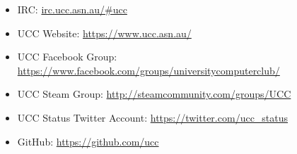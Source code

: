 
\begin{itemize}
\item IRC:  \url{irc.ucc.asn.au/\#ucc}
\item UCC Website:  \url{https://www.ucc.asn.au/}
\item UCC Facebook Group:  \\ \noindent \url{https://www.facebook.com/groups/universitycomputerclub/}
\item UCC Steam Group: \url{http://steamcommunity.com/groups/UCC}
\item UCC Status Twitter Account: \url{https://twitter.com/ucc_status}
\item GitHub: \url{https://github.com/ucc}

\end{itemize}


